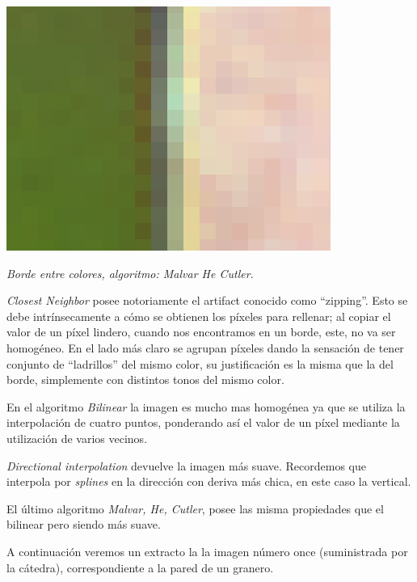 	\begin{center}
		\includegraphics[scale=.5]{../enunciado/images_files/cualitativo/pico_loro_malvar.png}
		\vspace{2pt}
		\par
		\footnotesize\textit{Borde entre colores, algoritmo: Malvar He Cutler.}
	\end{center}

 \textit{Closest Neighbor}  posee notoriamente el artifact conocido como ``zipping''. Esto se debe intrínsecamente a cómo se obtienen los píxeles para rellenar; al copiar el valor de un píxel lindero, cuando nos encontramos en un borde, este, no va ser homogéneo. En el lado más claro se agrupan píxeles dando la sensación de tener conjunto de ``ladrillos'' del mismo color, su justificación es la misma que la del borde, simplemente con distintos tonos del mismo color.

En el algoritmo \textit{Bilinear} la imagen es mucho mas homogénea ya que se utiliza la interpolación de cuatro puntos, ponderando así el valor de un píxel mediante la utilización de varios vecinos.

\textit{Directional interpolation} devuelve la imagen más suave. Recordemos que interpola por \textit{splines} en la dirección con deriva más chica, en este caso la vertical. 

El último algoritmo \textit{Malvar, He, Cutler}, posee las misma propiedades que el bilinear pero siendo más suave.

A continuación veremos un extracto la la imagen número once (suministrada por la cátedra), correspondiente a la pared de un granero.

